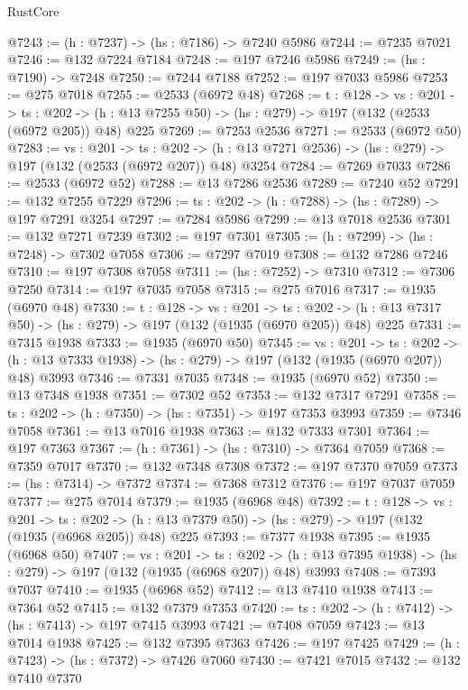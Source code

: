 \begin{lexlean}{RustCore}
\begin{coremodule}
@7243 := (h : @7237) -> (hs : @7186) -> @7240 @5986
@7244 := @7235 @7021
@7246 := @132 @7224 @7184
@7248 := @197 @7246 @5986
@7249 := (hs : @7190) -> @7248
@7250 := @7244 @7188
@7252 := @197 @7033 @5986
@7253 := @275 @7018
@7255 := @2533 (@6972 @48)
@7268 := {t : @128} ->
  {vs : @201} ->
  {ts : @202} -> (h : @13 @7255 @50) -> (hs : @279) -> @197 (@132 (@2533 (@6972 @205)) @48) @225
@7269 := @7253 @2536
@7271 := @2533 (@6972 @50)
@7283 := {vs : @201} ->
  {ts : @202} -> (h : @13 @7271 @2536) -> (hs : @279) -> @197 (@132 (@2533 (@6972 @207)) @48) @3254
@7284 := @7269 @7033
@7286 := @2533 (@6972 @52)
@7288 := @13 @7286 @2536
@7289 := @7240 @52
@7291 := @132 @7255 @7229
@7296 := {ts : @202} -> (h : @7288) -> (hs : @7289) -> @197 @7291 @3254
@7297 := @7284 @5986
@7299 := @13 @7018 @2536
@7301 := @132 @7271 @7239
@7302 := @197 @7301
@7305 := (h : @7299) -> (hs : @7248) -> @7302 @7058
@7306 := @7297 @7019
@7308 := @132 @7286 @7246
@7310 := @197 @7308 @7058
@7311 := (hs : @7252) -> @7310
@7312 := @7306 @7250
@7314 := @197 @7035 @7058
@7315 := @275 @7016
@7317 := @1935 (@6970 @48)
@7330 := {t : @128} ->
  {vs : @201} ->
  {ts : @202} -> (h : @13 @7317 @50) -> (hs : @279) -> @197 (@132 (@1935 (@6970 @205)) @48) @225
@7331 := @7315 @1938
@7333 := @1935 (@6970 @50)
@7345 := {vs : @201} ->
  {ts : @202} -> (h : @13 @7333 @1938) -> (hs : @279) -> @197 (@132 (@1935 (@6970 @207)) @48) @3993
@7346 := @7331 @7035
@7348 := @1935 (@6970 @52)
@7350 := @13 @7348 @1938
@7351 := @7302 @52
@7353 := @132 @7317 @7291
@7358 := {ts : @202} -> (h : @7350) -> (hs : @7351) -> @197 @7353 @3993
@7359 := @7346 @7058
@7361 := @13 @7016 @1938
@7363 := @132 @7333 @7301
@7364 := @197 @7363
@7367 := (h : @7361) -> (hs : @7310) -> @7364 @7059
@7368 := @7359 @7017
@7370 := @132 @7348 @7308
@7372 := @197 @7370 @7059
@7373 := (hs : @7314) -> @7372
@7374 := @7368 @7312
@7376 := @197 @7037 @7059
@7377 := @275 @7014
@7379 := @1935 (@6968 @48)
@7392 := {t : @128} ->
  {vs : @201} ->
  {ts : @202} -> (h : @13 @7379 @50) -> (hs : @279) -> @197 (@132 (@1935 (@6968 @205)) @48) @225
@7393 := @7377 @1938
@7395 := @1935 (@6968 @50)
@7407 := {vs : @201} ->
  {ts : @202} -> (h : @13 @7395 @1938) -> (hs : @279) -> @197 (@132 (@1935 (@6968 @207)) @48) @3993
@7408 := @7393 @7037
@7410 := @1935 (@6968 @52)
@7412 := @13 @7410 @1938
@7413 := @7364 @52
@7415 := @132 @7379 @7353
@7420 := {ts : @202} -> (h : @7412) -> (hs : @7413) -> @197 @7415 @3993
@7421 := @7408 @7059
@7423 := @13 @7014 @1938
@7425 := @132 @7395 @7363
@7426 := @197 @7425
@7429 := (h : @7423) -> (hs : @7372) -> @7426 @7060
@7430 := @7421 @7015
@7432 := @132 @7410 @7370

\end{coremodule}
\end{lexlean}
